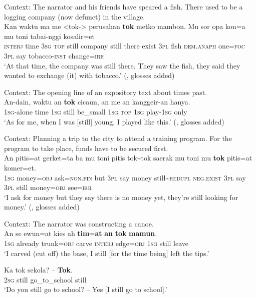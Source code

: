 \begin{exe}
	\ex\label{exAppendixKalamang1}
	Context: The narrator and his friends have speared a fish. There used to be a logging company (now defunct) in the village.\\
	\gll Kan waktu ma me <tok-> perusahan \textbf{tok} metko mambon. Mu sor opa kon=a mu toni tabai-nggi kosalir=et\\
		\textsc{interj} time 3\textsc{sg} \textsc{top} still company still there exist 3\textsc{pl} fish \textsc{dem}.\textsc{anaph} one=\textsc{foc} 3\textsc{pl} say tobacco-\textsc{inst} change=\textsc{irr}\\
	\glt \lq At that time, the company was still there. They saw the fish, they said they wanted to exchange (it) with tobacco.\rq{ }(\cite{Visser2021b}, glosses added) 
	
	\ex\label{exAppendixKalamang2}
	Context: The opening line of an expository text about times past.\\
	\gll An-dain, waktu an \textbf{tok} cicaun, an me an kanggeir-an hanya.\\
		1\textsc{sg}-alone time 1\textsc{sg} still be\_small 1\textsc{sg} \textsc{top} 1\textsc{sg} play-1\textsc{sg} only\\
	\glt \lq As for me, when I was [still] young, I played like this.\rq{ }(\cite{Visser2021b}, glosses added)
		
	\ex\label{exAppendixKalamang3}
	Context: Planning a trip to the city to attend a training program. For the program to take place, funds have to be secured first.\\
	\gll An pitis=at gerket=ta ba mu toni pitis tok\sim{}tok saerak mu toni mu \textbf{tok} pitis=at komer=et.\\
		1\textsc{sg} money=\textsc{obj} ask=\textsc{non}.\textsc{fin} but 3\textsc{pl} say money still\sim\textsc{redupl} \textsc{neg}.\textsc{exist} 3\textsc{pl} say 3\textsc{pl} still money=\textsc{obj} see=\textsc{irr}\\
	\glt \lq I ask for money but they say there is no money yet, they're still looking for money.' (\cite{Visser2021b}, glosses added)

	\ex\label{exAppendixKalamang4}
	Context: The narrator was constructing a canoe.\\
	\gll An se ewun=at kies ah \textbf{tim}=\textbf{at} \textbf{an} \textbf{tok} \textbf{mamun}.\\
	1\textsc{sg} already trunk=\textsc{obj} carve \textsc{interj} edge=\textsc{obj} 1\textsc{sg} still leave\\
	\glt \lq I carved (cut off) the base, I still [for the time being] left the tips.\rq{ }\parencite{Visser2021b}
	
	\ex \label{exAppendixKalamang5}
	\gll Ka tok sekola? – \textbf{Tok}.\\
	2\textsc{sg} still go\_to\_school {} still\\
	\glt \lq Do you still go to school? -- Yes [I still go to school].\rq{ }\parencite[355]{Visser2022}
\end{exe}

